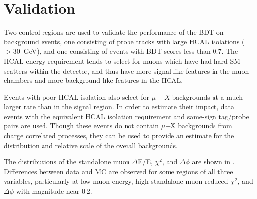 \section{Validation}
\label{sec:BDTvalid}
Two control regions are used to validate the performance of the BDT on background events, one consisting of probe tracks with large HCAL isolations ($>$\SI{30}{\giga\eV}), and one consisting of events with BDT scores less than 0.7. 
The HCAL energy requirement tends to select for muons which have had hard SM scatters within the detector, and thus have more signal-like features in the muon chambers and more background-like features in the HCAL.

Events with poor HCAL isolation also select for $\mu+X$ backgrounds at a much larger rate than in the signal region.
In order to estimate their impact, data events with the equivalent HCAL isolation requirement and same-sign tag/probe pairs are used.
Though these events do not contain $\mu$+X backgrounds from charge correlated processes, they can be used to provide an estimate for the distribution and relative scale of the overall backgrounds.

The distributions of the standalone muon $\Delta$E/E, $\chi^{2}$, and $\Delta\phi$ are shown in . 
Differences between data and MC are observed for some regions of all three variables, particularly at low muon energy, high standalone muon reduced $\chi^{2}$, and $\Delta\phi$ with magnitude near 0.2. 

